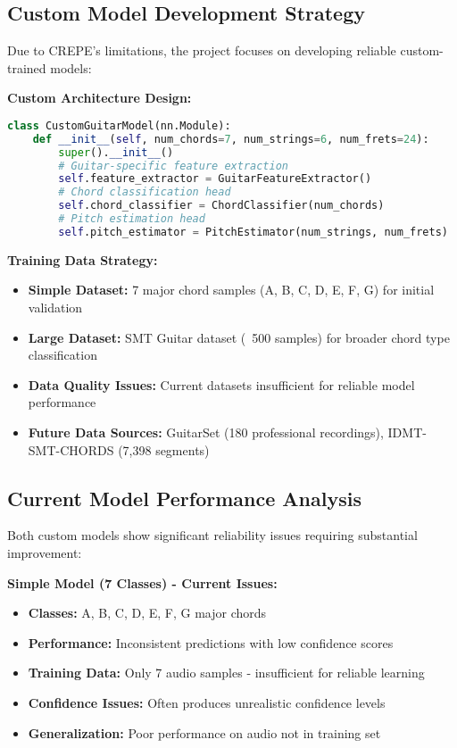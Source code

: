 \documentclass[11pt]{article}
\begin{document}
\subsection*{Custom Model Development Strategy}
Due to CREPE's limitations, the project focuses on developing reliable custom-trained models:

\textbf{Custom Architecture Design:}
\begin{lstlisting}[language=Python, caption={Custom Model Architecture}]
class CustomGuitarModel(nn.Module):
    def __init__(self, num_chords=7, num_strings=6, num_frets=24):
        super().__init__()
        # Guitar-specific feature extraction
        self.feature_extractor = GuitarFeatureExtractor()
        # Chord classification head
        self.chord_classifier = ChordClassifier(num_chords)
        # Pitch estimation head
        self.pitch_estimator = PitchEstimator(num_strings, num_frets)
\end{lstlisting}

\textbf{Training Data Strategy:}
\begin{itemize}[leftmargin=*,itemsep=2pt]
  \item \textbf{Simple Dataset:} 7 major chord samples (A, B, C, D, E, F, G) for initial validation
  \item \textbf{Large Dataset:} SMT Guitar dataset (~500 samples) for broader chord type classification
  \item \textbf{Data Quality Issues:} Current datasets insufficient for reliable model performance
  \item \textbf{Future Data Sources:} GuitarSet (180 professional recordings), IDMT-SMT-CHORDS (7,398 segments)
\end{itemize}

\subsection*{Current Model Performance Analysis}
Both custom models show significant reliability issues requiring substantial improvement:

\textbf{Simple Model (7 Classes) - Current Issues:}
\begin{itemize}[leftmargin=*,itemsep=1pt]
  \item \textbf{Classes:} A, B, C, D, E, F, G major chords
  \item \textbf{Performance:} Inconsistent predictions with low confidence scores
  \item \textbf{Training Data:} Only 7 audio samples - insufficient for reliable learning
  \item \textbf{Confidence Issues:} Often produces unrealistic confidence levels
  \item \textbf{Generalization:} Poor performance on audio not in training set
\end{itemize}
\end{document}
